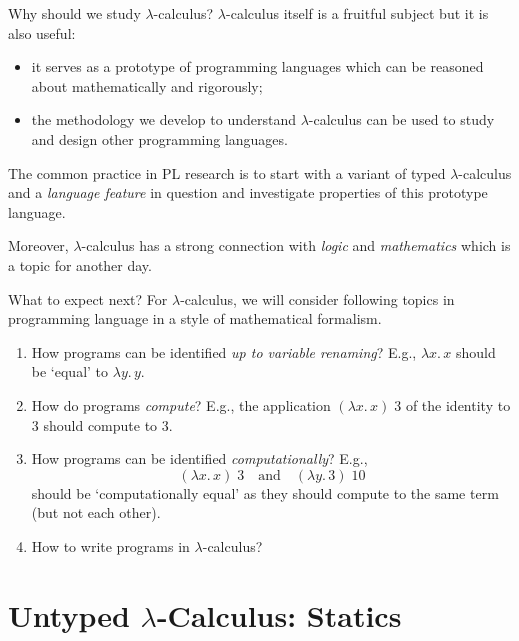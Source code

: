 \begin{frame}{Why should we study $\lambda$-calculus?}
  $\lambda$-calculus itself is a fruitful subject but it is also useful: 
  \begin{itemize}
    \item it serves as a prototype of programming languages which can be reasoned about \alert{mathematically} and \alert{rigorously};
    \item the methodology we develop to understand $\lambda$-calculus can be used to study and design other programming languages.
  \end{itemize}
  \vfill
  The common practice in PL research is to start with a variant of typed $\lambda$-calculus and a \emph{language feature} in question and investigate properties of this prototype language.

  \vfill 
  Moreover, $\lambda$-calculus has a strong connection with \emph{logic} and \emph{mathematics} which is a topic for another day.
\end{frame}

\begin{frame}{What to expect next?}
  For $\lambda$-calculus, we will consider following topics in programming language in a style of mathematical formalism.
  \begin{enumerate}
    \item How programs can be identified \emph{up to variable renaming}?
      E.g., $\lambda x.\, x$ should be `equal' to $\lambda y.\, y$.
    \item How do programs \emph{compute}?
      E.g., the application $(\lambda x.\, x)\;3$ of the identity to $3$ should compute to $3$.
    \item How programs can be identified \emph{computationally}?
      E.g.,
      \[
        (\lambda x.\, x)\;3 \quad\text{and}\quad (\lambda y.\, 3)\;10
      \]
      should be `computationally equal' as they should compute to the same term (but not each other).
    \item How to write programs in $\lambda$-calculus?
  \end{enumerate}
\end{frame}

\section{Untyped \texorpdfstring{$\lambda$}{λ}-Calculus: Statics}

